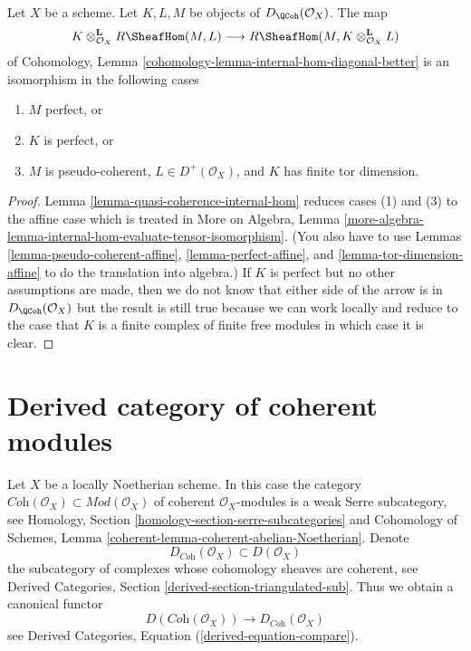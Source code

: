 \begin{lemma}
\label{lemma-internal-hom-evaluate-tensor-isomorphism}
Let $X$ be a scheme. Let $K, L, M$ be objects of $D_\QCoh(\mathcal{O}_X)$.
The map
$$
K \otimes_{\mathcal{O}_X}^\mathbf{L} R\SheafHom(M, L)
\longrightarrow
R\SheafHom(M, K \otimes_{\mathcal{O}_X}^\mathbf{L} L)
$$
of Cohomology, Lemma \ref{cohomology-lemma-internal-hom-diagonal-better}
is an isomorphism in the following cases
\begin{enumerate}
\item $M$ perfect, or
\item $K$ is perfect, or
\item $M$ is pseudo-coherent, $L \in D^+(\mathcal{O}_X)$, and $K$ has finite
tor dimension.
\end{enumerate}
\end{lemma}

\begin{proof}
Lemma \ref{lemma-quasi-coherence-internal-hom}
reduces cases (1) and (3) to the affine case which is treated in
More on Algebra, Lemma
\ref{more-algebra-lemma-internal-hom-evaluate-tensor-isomorphism}.
(You also have to use Lemmas \ref{lemma-pseudo-coherent-affine},
\ref{lemma-perfect-affine}, and \ref{lemma-tor-dimension-affine}
to do the translation into algebra.)
If $K$ is perfect but no other assumptions are made, then we
do not know that either side of the arrow is in $D_\QCoh(\mathcal{O}_X)$
but the result is still true because we can work locally and reduce
to the case that $K$ is a finite complex of finite free modules
in which case it is clear.
\end{proof}





\section{Derived category of coherent modules}
\label{section-derived-coherent}

\noindent
Let $X$ be a locally Noetherian scheme. In this case the category
$\textit{Coh}(\mathcal{O}_X) \subset \textit{Mod}(\mathcal{O}_X)$
of coherent $\mathcal{O}_X$-modules is a weak Serre subcategory, see
Homology, Section \ref{homology-section-serre-subcategories}
and
Cohomology of Schemes, Lemma \ref{coherent-lemma-coherent-abelian-Noetherian}.
Denote
$$
D_{\textit{Coh}}(\mathcal{O}_X) \subset D(\mathcal{O}_X)
$$
the subcategory of complexes whose cohomology sheaves are coherent, see
Derived Categories, Section \ref{derived-section-triangulated-sub}.
Thus we obtain a canonical functor
\begin{equation}
\label{equation-compare-coherent}
D(\textit{Coh}(\mathcal{O}_X))
\longrightarrow
D_{\textit{Coh}}(\mathcal{O}_X)
\end{equation}
see Derived Categories, Equation (\ref{derived-equation-compare}).

